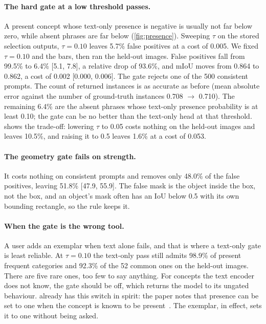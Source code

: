 \paragraph{The hard gate at a low threshold passes.}
A present concept whose text-only presence is negative is usually not far below zero, while absent phrases are far below (\cref{fig:presence}).
Sweeping $\tau$ on the stored selection outputs, $\tau = 0.10$ leaves 5.7\% false positives at a cost of 0.005.
We fixed $\tau = 0.10$ and the bars, then ran the held-out images.
False positives fall from 99.5\% to 6.4\% [5.1, 7.8], a relative drop of 93.6\%, and mIoU moves from 0.864 to 0.862, a cost of 0.002 [0.000, 0.006].
The gate rejects one of the 500 consistent prompts.
The count of returned instances is as accurate as before (mean absolute error against the number of ground-truth instances 0.708 $\to$ 0.710).
The remaining 6.4\% are the absent phrases whose text-only presence probability is at least 0.10; the gate can be no better than the text-only head at that threshold.
 shows the trade-off: lowering $\tau$ to 0.05 costs nothing on the held-out images and leaves 10.5\%, and raising it to 0.5 leaves 1.6\% at a cost of 0.053.

\paragraph{The geometry gate fails on strength.}
It costs nothing on consistent prompts and removes only 48.0\% of the false positives, leaving 51.8\% [47.9, 55.9].
The false mask is the object inside the box, not the box, and an object's mask often has an IoU below 0.5 with its own bounding rectangle, so the rule keeps it.

\paragraph{When the gate is the wrong tool.}
A user adds an exemplar when text alone fails, and that is where a text-only gate is least reliable.
At $\tau = 0.10$ the text-only pass still admits 98.9\% of present frequent categories and 92.3\% of the 52 common ones on the held-out images.
There are five rare ones, too few to say anything.
For concepts the text encoder does not know, the gate should be off, which returns the model to its ungated behaviour.
\sam{} already has this switch in spirit: the paper notes that presence can be set to one when the concept is known to be present~\cite{carion2026sam3}.
The exemplar, in effect, sets it to one without being asked.
